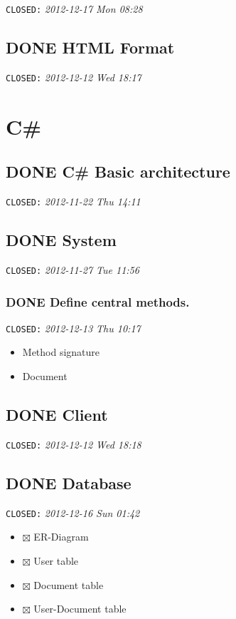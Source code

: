 \documentclass[11pt,a4paper]{article}
\begin{document}
   \texttt{CLOSED:} \textit{2012-12-17 Mon 08:28}
\subsection{\textbf{DONE} HTML Format}
\label{sec-1-17}

   \texttt{CLOSED:} \textit{2012-12-12 Wed 18:17}
\section{C\#}
\label{sec-2}
\subsection{\textbf{DONE} C\# Basic architecture}
\label{sec-2-1}

   \texttt{CLOSED:} \textit{2012-11-22 Thu 14:11}
\subsection{\textbf{DONE} System}
\label{sec-2-2}

   \texttt{CLOSED:} \textit{2012-11-27 Tue 11:56}
\subsubsection{\textbf{DONE} Define central methods.}
\label{sec-2-2-1}

    \texttt{CLOSED:} \textit{2012-12-13 Thu 10:17}

\begin{itemize}
\item Method signature
\item Document
\end{itemize}
\subsection{\textbf{DONE} Client}
\label{sec-2-3}

   \texttt{CLOSED:} \textit{2012-12-12 Wed 18:18}
\subsection{\textbf{DONE} Database}
\label{sec-2-4}

   \texttt{CLOSED:} \textit{2012-12-16 Sun 01:42}

\begin{itemize}
\item $\boxtimes$ ER-Diagram
\item $\boxtimes$ User table
\item $\boxtimes$ Document table
\item $\boxtimes$ User-Document table
\end{itemize}
\end{document}
